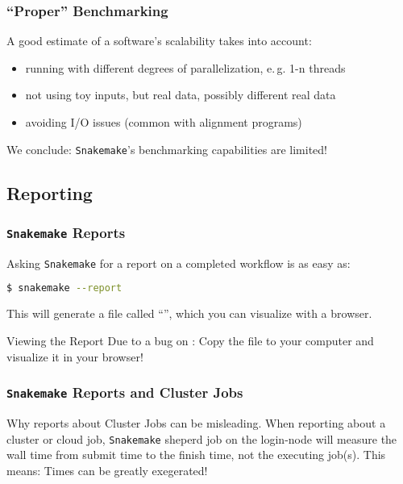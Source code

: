 \begin{frame}
  \frametitle{``Proper'' Benchmarking}
  A good estimate of a software's scalability takes into account:
  \begin{itemize}[<+->]
   \item running with different degrees of parallelization, e.\,g. 1-n threads
   \item not using toy inputs, but real data, possibly different real data
   \item avoiding I/O issues (common with alignment programs)
  \end{itemize}
  \pause
  \begin{warning}
  	We conclude: \texttt{Snakemake}'s benchmarking capabilities are limited!
  \end{warning}
\end{frame}


\subsection{Reporting}


\begin{frame}[fragile]
  \frametitle{\texttt{Snakemake} Reports}
  Asking \texttt{Snakemake} for a report on a completed workflow is as easy as:
  \begin{lstlisting}[language=Bash, style=Shell]
$ snakemake --report
  \end{lstlisting}
  This will generate a file called ``'', which you can visualize with a browser.
  \pause
  \begin{alertblock}{Viewing the Report}
   Due to a bug on \mogon: Copy the file to your computer and visualize it in your browser!
  \end{alertblock}
\end{frame} 

\begin{frame}
  \frametitle{\texttt{Snakemake} Reports and Cluster Jobs}
  \begin{alertblock}{Why reports about Cluster Jobs can be misleading.}
    When reporting about a cluster or cloud job, \texttt{Snakemake} sheperd job on the login-node will measure the wall time from submit time to the finish time, not the executing job(s).\newline
    This means: Times can be greatly exegerated!
  \end{alertblock}
\end{frame} 

